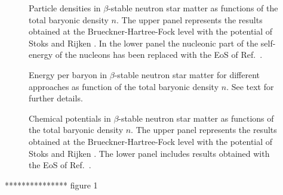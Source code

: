 \begin{figure}[hbtp]
   \caption{Particle densities in $\beta$-stable neutron star matter
            as functions of the total baryonic density $n$.
            The upper panel represents the results obtained at the 
            Brueckner-Hartree-Fock level with the potential of Stoks and
            Rijken \protect\cite{sr99}. 
            In the  lower panel the nucleonic part of the self-energy of the nucleons
            has been replaced 
            with the EoS of Ref.\ \protect\cite{apr98}. }
   \label{fig:fraction}
\end{figure}

\begin{figure}
   \caption{Energy per baryon in $\beta$-stable neutron star matter for
            different approaches  as function of the total baryonic density $n$.
            See text for further details.}
   \label{fig:eosfig}
\end{figure}



\begin{figure}[hbtp]
   \caption{Chemical potentials in $\beta$-stable neutron star matter
            as functions of the total baryonic density $n$.
            The upper panel represents the results obtained at the 
            Brueckner-Hartree-Fock level with the potential of Stoks and
            Rijken \protect\cite{sr99}. 
            The lower panel includes results obtained
            with the EoS of Ref.\  \protect\cite{apr98}. }
   \label{fig:chempots}
\end{figure}







***************  figure 1


